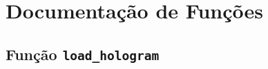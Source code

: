\chapter{Documentação de Funções}
\label{ch::doc-codigo}



\section{Função \texttt{load\_hologram}}
\label{sec::doc-codigo:load_hologram}

